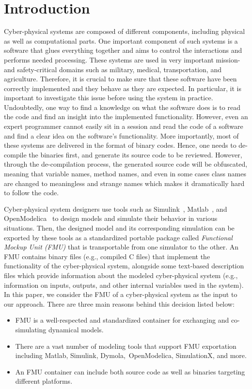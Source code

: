 \section{Introduction}
\label{sec:Introduction}
Cyber-physical systems are composed of different components, including physical as well as computational parts. One important component of such systems is a software that glues everything together and aims to control the interactions and performs needed processing.
These systems are used in very important mission- and safety-critical domains such as military, medical, transportation, and agriculture.
Therefore, it is crucial to make sure that these software have been correctly implemented and they behave as they are expected. In particular, it is important to investigate this issue before using the system in practice.
Undoubtedly, one way to find a knowledge on what the software does is to read the code and find an insight into the implemented functionality. However, even an expert programmer cannot easily sit in a session and read the code of a software and find a clear idea on the software's functionality. More importantly, most of these systems are delivered in the format of binary codes. Hence, one needs to de-compile the binaries first, and generate its source code to be reviewed. However, through the de-compilation process, the generated source code will be obfuscated, meaning that variable names, method names, and even in some cases class names are changed to meaningless and strange names which makes it dramatically hard to follow the code.

Cyber-physical system designers use tools such as Simulink~\citeme{}, Matlab~\citeme{}, and OpenModelica~\citeme{} to design models and simulate their behavior in various situations. Then, the designed model and its corresponding simulation can be exported by these tools as a standardized portable package called \textit{Functional Mockup Unit (FMU)} that is transportable from one simulator to the other. An FMU contains binary files (e.g., compiled C files) that implement the functionality of the cyber-physical system, alongside some text-based description files which provide information about the modeled cyber-physical system (e.g., information on inputs, outputs, and other internal variables used in the system). 
In this paper, we consider the FMU of a cyber-physical system as the input to our approach. There are three main reasons behind this decision listed below:
\begin{itemize}
    \item FMU is a well-respected and standardized container for exchanging and co-simulating dynamical models.
    \item There are a vast number of modeling tools that support FMU exportation including Matlab, Simulink, Dymola, OpenModelica, SimulationX, and more.
    \item An FMU container can include both source code as well as binaries targeting different platforms.
\end{itemize}


